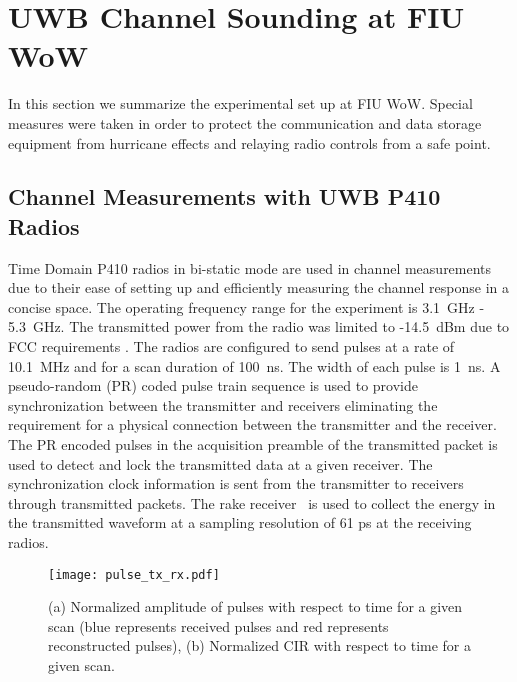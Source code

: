 \documentclass[conference]{IEEEtran}
\begin{document}

\section{UWB Channel Sounding at FIU WoW}
In this section we summarize the experimental set up at FIU WoW. Special measures were taken in order to protect the communication and data storage equipment from hurricane effects and relaying radio controls from a safe point.  

\subsection{Channel Measurements with UWB P410 Radios}
Time Domain P410 radios in bi-static mode are used in channel measurements due to their ease of setting up and efficiently measuring the channel response in a concise space. The operating frequency range for the experiment is 3.1~GHz - 5.3~GHz. The transmitted power from the radio was limited to -14.5~dBm due to FCC requirements \cite{FCC1}. The radios are configured to send pulses at a rate of 10.1~MHz and for a scan duration of 100~ns. The width of each pulse is 1~ns. A pseudo-random (PR) coded pulse train sequence is used to provide synchronization between the transmitter and receivers eliminating the requirement for a physical connection between the transmitter and the receiver. The PR encoded pulses in the acquisition preamble of the transmitted packet is used to detect and lock the transmitted data at a given receiver. The synchronization clock information is sent from the transmitter to receivers through transmitted packets. The  rake receiver~\cite{guvenc2011reliable} is used to collect the energy in the transmitted waveform at a sampling resolution of 61 ps at the receiving radios.  

\begin{figure}[!t]
	\centering
	\texttt{[image: pulse\_tx\_rx.pdf]}
	\caption{(a) Normalized amplitude of pulses with respect to time for a given scan (blue represents received pulses and red represents reconstructed pulses), (b) Normalized CIR with respect to time for a given scan.}\label{Fig:pulse_tx_rx}
\vspace{-0.4 cm}
\end{figure}
\end{document}

